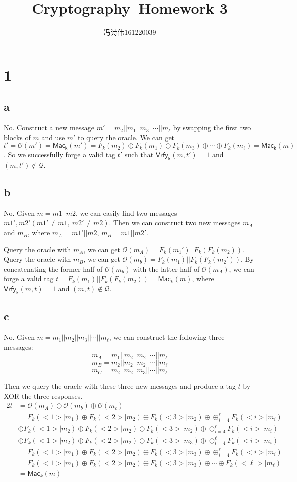 \documentclass[a4papers]{ctexart}
\title{Cryptography--Homework 3}
\author{冯诗伟161220039}
\date{}
\newcommand{\mc}[1]{\mathcal{#1}}
\newcommand{\ms}[1]{\mathsf{#1}}
\begin{document}
\maketitle
\section*{1}
\subsection*{a}
No. Construct a new message $m'=m_2||m_1||m_3||\cdots||m_\ell$ by swapping the first two blocks of $m$ and use $m'$ to query the oracle.
We can get $t'=\mc{O}(m')=\ms{Mac_k}(m')=F_k(m_2)\oplus F_k(m_1)\oplus F_k(m_3)\oplus \cdots \oplus F_k(m_\ell)=\ms{Mac_k}(m)$.
So we successfully forge a valid tag $t'$ such that $\ms{Vrfy_k}(m,t')=1$ and $(m,t')\notin \mc{Q}$.

\subsection*{b}
No. Given $m=m1||m2$, we can easily find two messages $m1', m2'(m1'\ne m1,\ m2'\ne m2)$. Then we can construct two new messages $m_A$ and $m_B$, where
$m_A=m1'||m2$, $m_B=m1||m2'$. 

Query the oracle with $m_A$, we can get $\mc{O}(m_A)=F_k(m_1')||F_k(F_k(m_2))$.
Query the oracle with $m_B$, we can get $\mc{O}(m_b)=F_k(m_1)||F_k(F_k(m_2'))$.
By concatenating the former half of $\mc{O}(m_b)$ with the latter half of $\mc{O}(m_A)$, we can forge a valid tag $t=F_k(m_1)||F_k(F_k(m_2))=\ms{Mac}_k(m)$, where $\ms{Vrfy_k}(m,t)=1$ and $(m,t)\notin \mc{Q}$.

\subsection*{c}
No. Given $m=m_1||m_2||m_3||\cdots||m_\ell$, we can construct the following three messages:
\[m_A=m_1||m_2||m_2||\cdots||m_\ell\]
\[m_B=m_2||m_2||m_2||\cdots||m_\ell\]
\[m_C=m_2||m_2||m_3||\cdots||m_\ell\]

Then we query the oracle with these three new messages and produce a tag $t$ by 
XOR the three responses.
\begin{alignat*}{2}
    t &= \mc{O}(m_A)\oplus \mc{O}(m_b)\oplus \mc{O}(m_c)\\
    &= F_k(<1>|m_1)\oplus F_k(<2>|m_2)\oplus F_k(<3>|m_2)\oplus \oplus^{\ell}_{i=4} F_k(<i>|m_i)\\
    &\oplus  F_k(<1>|m_2)\oplus F_k(<2>|m_2)\oplus F_k(<3>|m_2)\oplus \oplus^{\ell}_{i=4} F_k(<i>|m_i)\\
    &\oplus  F_k(<1>|m_2)\oplus F_k(<2>|m_2)\oplus F_k(<3>|m_3)\oplus \oplus^{\ell}_{i=4} F_k(<i>|m_i)\\
    &= F_k(<1>|m_1)\oplus F_k(<2>|m_2)\oplus F_k(<3>|m_3)\oplus \oplus^{\ell}_{i=4} F_k(<i>|m_i)\\
    &= F_k(<1>|m_1)\oplus F_k(<2>|m_2)\oplus F_k(<3>|m_3)\oplus \cdots \oplus F_k(<\ell>|m_\ell)\\
    &= \ms{Mac}_k(m)
\end{alignat*}
\end{document}
